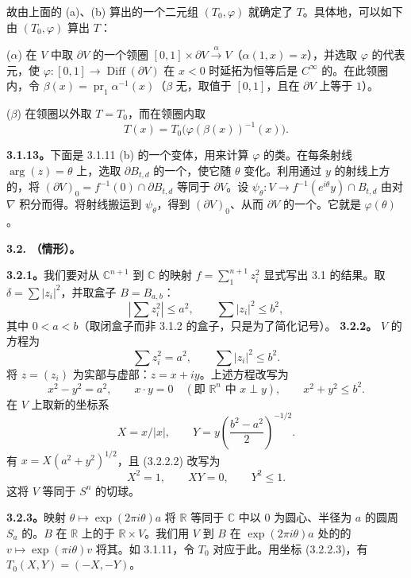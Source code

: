 故由上面的 (a)、(b) 算出的一个二元组 $(T_0,\varphi)$ 就确定了 $T$。具体地，可以如下由 $(T_0,\varphi)$ 算出 $T$：

($\alpha$) 在 $V$ 中取 $\partial V$ 的一个领圈 $[0,1]\times\partial V\xrightarrow{\alpha}V$（$\alpha(1,x)=x$），并选取 $\varphi$ 的代表元，使 $\varphi:[0,1]\to\operatorname{Diff}(\partial V)$ 在 $x<0$ 时延拓为恒等后是 $C^\infty$ 的。在此领圈内，令 $\beta(x)=\operatorname{pr}_1\alpha^{-1}(x)$（$\beta$ 无，取值于 $[0,1]$，且在 $\partial V$ 上等于 $1$）。

($\beta$) 在领圈以外取 $T=T_0$，而在领圈内取
\[
 T(x)=T_0\bigl(\varphi(\beta(x))^{-1}(x)\bigr).
\]

\textbf{3.1.13。}下面是 3.1.11 (b) 的一个变体，用来计算 $\varphi$ 的类。在每条射线 $\arg(z)=\theta$ 上，选取 $\partial B_{t,d}$ 的一个，使它随 $\theta$ 变化。利用通过 $y$ 的射线上方的，将 $(\partial V)_0=f^{-1}(0)\cap\partial B_{t,d}$ 等同于 $\partial V$。设 $\psi_\theta:V\to f^{-1}(e^{i\theta}y)\cap B_{t,d}$ 由对 $\nabla$ 积分而得。将射线搬运到 $\psi_\theta$，得到 $(\partial V)_0$、从而 $\partial V$ 的一个。它就是 $\varphi(\theta)$。

\textbf{3.2. （情形）。}

\textbf{3.2.1。}我们要对从 $\mathbb C^{n+1}$ 到 $\mathbb C$ 的映射 $f=\sum_{1}^{n+1}z_i^2$ 显式写出 3.1 的结果。取 $\delta=\sum|z_i|^2$，并取盒子 $B=B_{a,b}$：
\[
 \left|\sum z_i^2\right|\leq a^2,\qquad\sum|z_i|^2\leq b^2,
\]
其中 $0<a<b$（取闭盒子而非 3.1.2 的盒子，只是为了简化记号）。
\textbf{3.2.2。} $V$ 的方程为
\[
 \sum z_i^2=a^2,\qquad\sum|z_i|^2\leq b^2.\tag{3.2.2.1}
\]
将 $z=(z_i)$ 为实部与虚部：$z=x+iy$。上述方程改写为
\[
 x^2-y^2=a^2,\qquad x\cdot y=0\quad(\text{即 }\mathbb R^n\text{ 中 }x\perp y),\qquad
 x^2+y^2\leq b^2.\tag{3.2.2.2}
\]
在 $V$ 上取新的坐标系
\[
 X=x/|x|,\qquad Y=y\left(\frac{b^2-a^2}{2}\right)^{-1/2}.
\]
有 $x=X(a^2+y^2)^{1/2}$，且 (3.2.2.2) 改写为
\[
 X^2=1,\qquad XY=0,\qquad Y^2\leq1.\tag{3.2.2.3}
\]
这将 $V$ 等同于 $S^n$ 的切球。

\textbf{3.2.3。}映射 $\theta\mapsto\exp(2\pi i\theta)a$ 将 $\mathbb R$ 等同于 $\mathbb C$ 中以 $0$ 为圆心、半径为 $a$ 的圆周 $S_a$ 的。$B$ 在 $\mathbb R$ 上的于 $\mathbb R\times V$。我们用 $V$ 到 $B$ 在 $\exp(2\pi i\theta)a$ 处的的 $v\mapsto\exp(\pi i\theta)v$ 将其。如 3.1.11，令 $T_0$ 对应于此。用坐标 (3.2.2.3)，有 $T_0(X,Y)=(-X,-Y)$。

